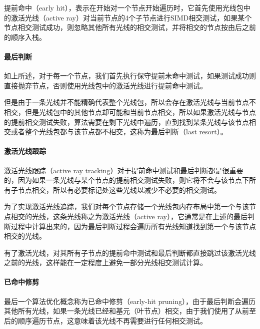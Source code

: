 提前命中（early hit），表示在开始对一个节点开始遍历时，它首先使用光线包中的激活光线（active ray）对当前节点的4个子节点进行SIMD相交测试，如果某个节点相交测试成功，则忽略其他所有光线的相交测试，并将相交的节点按由后之前的顺序入栈。




\paragraph{最后判断}
如上所述，对于每一个节点，我们首先执行保守提前未命中测试，如果测试成功则直接抛弃节点，否则使用光线包中的激活光线进行提前命中测试。

但是由于一条光线并不能精确代表整个光线包，所以会存在激活光线与当前节点不相交，但是光线包中的其他节点却可能和当前节点相交，所以如果激活光线与节点的提前相交测试失败，算法需要在剩下光线中遍历，直到找到某条光线与该节点相交或者整个光线包都与该节点都不相交，这称为最后判断（last resort）。






\paragraph{激活光线跟踪}
激活光线跟踪（active ray tracking）对于提前命中测试和最后判断都是很重要的，因为如果一条光线与某个节点的提前相交测试失败，则它将不会与该节点下所有子节点相交，所以有必要标记处这些光线以减少不必要的相交测试。

为了实现激活光线追踪，我们对每个节点存储一个光线包内存布局中第一个与该节点相交的光线，这条光线称之为激活光线（active ray），它通常是在上述的最后判断过程中计算出来的，因为最后判断过程会遍历所有光线知道找到第一个与该节点相交的光线。

有了激活光线，对其所有子节点的提前命中测试和最后判断都直接跳过该激活光线之前的光线，这样能在一定程度上避免一部分光线相交测试计算。





\paragraph{已命中修剪}
最后一个算法优化概念称为已命中修剪（early-hit pruning），由于最后判断会遍历其他所有光线，如果一条光线已经和基元（叶节点）相交，由于我们使用了从前至后的顺序遍历节点，这意味着该光线不再需要进行任何相交测试。

